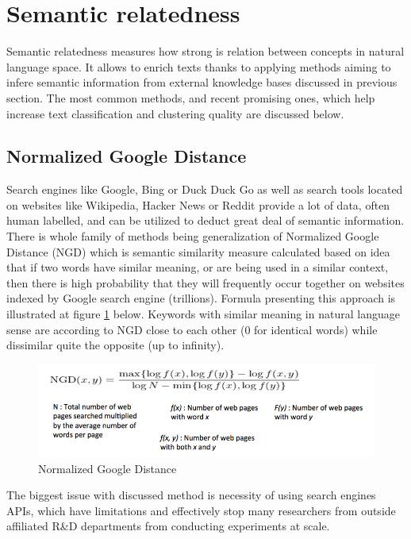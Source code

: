 \documentclass[a4paper, 12pt, oneside]{Thesis} %
\begin{document}
\section{Semantic relatedness} Semantic relatedness measures how strong is relation between concepts in natural language space. It allows to enrich texts thanks to applying methods aiming to infere semantic information from external knowledge bases discussed in previous section. The most common methods, and recent promising ones, which help increase text classification and clustering quality are discussed below.

\subsection{Normalized Google Distance} Search engines like Google, Bing or Duck Duck Go as well as search tools located on websites like Wikipedia, Hacker News or Reddit provide a lot of data, often human labelled, and can be utilized to deduct great deal of semantic information. There is whole family of methods being generalization of Normalized Google Distance (NGD) \cite{cilibrasi2007google} which is semantic similarity measure calculated based on idea that if two words have similar meaning, or are being used in a similar context, then there is high probability that they will frequently occur together on websites indexed by Google search engine (trillions). Formula presenting this approach is illustrated at figure \ref{fig:ngd} below. Keywords with similar meaning in natural language sense are according to NGD close to each other (0 for identical words) while dissimilar quite the opposite (up to infinity).

\begin{figure}[h]
  \centering
  \includegraphics[width=.95\linewidth]{Figures/ngd.png}
  \caption{Normalized Google Distance}
  \label{fig:ngd}
\end{figure}

The biggest issue with discussed method is necessity of using search engines APIs, which have limitations and effectively stop many researchers from outside affiliated R\&D departments from conducting experiments at scale.
\end{document}
